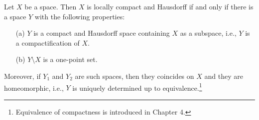 \begin{thm}
    Let $X$ be a space.
    Then $X$ is locally compact and Hausdorff if and only if there is a space $Y$ with the following properties:
    \begin{enumerate}
        \item[(a)] $Y$ is a compact and Hausdorff space containing $X$ as a subspace, i.e., $Y$ is a compactification of $X$.
        \item[(b)] $Y\setminus X$ is a one-point set.
    \end{enumerate}
    Moreover, if $Y_1$ and $Y_2$ are such spaces, then they coincides on $X$ and they are homeomorphic, i.e., $Y$ is uniquely determined up to equivalence.\footnote{Equivalence of compactness is introduced in Chapter 4.}
\end{thm}

